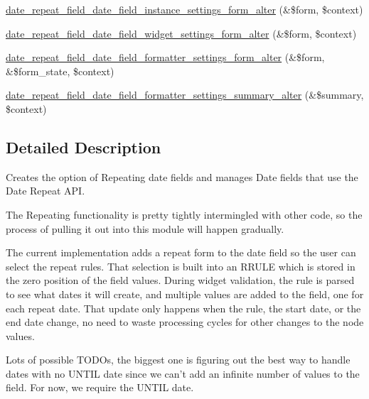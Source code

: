 \begin{DoxyCompactItemize}
\item 
\hyperlink{date__repeat__field_8module_a8e114c2eb4efc5ceaf666b4317792c98}{date\_\-repeat\_\-field\_\-date\_\-field\_\-instance\_\-settings\_\-form\_\-alter} (\&\$form, \$context)
\item 
\hyperlink{date__repeat__field_8module_a87cc72264b877be64aac471b62e09eb3}{date\_\-repeat\_\-field\_\-date\_\-field\_\-widget\_\-settings\_\-form\_\-alter} (\&\$form, \$context)
\item 
\hyperlink{date__repeat__field_8module_af98bfac81550fc3d718f9b068c51e301}{date\_\-repeat\_\-field\_\-date\_\-field\_\-formatter\_\-settings\_\-form\_\-alter} (\&\$form, \&\$form\_\-state, \$context)
\item 
\hyperlink{date__repeat__field_8module_ae3af2e31103aa2a0fac483249a477529}{date\_\-repeat\_\-field\_\-date\_\-field\_\-formatter\_\-settings\_\-summary\_\-alter} (\&\$summary, \$context)
\end{DoxyCompactItemize}


\subsection{Detailed Description}
Creates the option of Repeating date fields and manages Date fields that use the Date Repeat API.

The Repeating functionality is pretty tightly intermingled with other code, so the process of pulling it out into this module will happen gradually.

The current implementation adds a repeat form to the date field so the user can select the repeat rules. That selection is built into an RRULE which is stored in the zero position of the field values. During widget validation, the rule is parsed to see what dates it will create, and multiple values are added to the field, one for each repeat date. That update only happens when the rule, the start date, or the end date change, no need to waste processing cycles for other changes to the node values.

Lots of possible TODOs, the biggest one is figuring out the best way to handle dates with no UNTIL date since we can't add an infinite number of values to the field. For now, we require the UNTIL date. 

